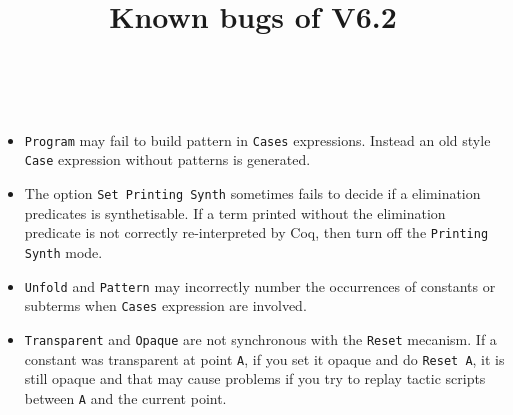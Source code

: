 \documentclass[11pt]{article}
\title{Known bugs of \Coq{} V6.2}
\author{\ }
\begin{document}
\maketitle

\begin{itemize}

\item {\tt Program} may fail to build pattern in {\tt Cases}
expressions. Instead an old style {\tt Case} expression without
patterns is generated.

\item The option {\tt Set Printing Synth} sometimes fails to decide if
a elimination predicates is synthetisable. If a term printed without
the elimination predicate is not correctly re-interpreted by Coq, then
turn off the {\tt Printing Synth} mode.

\item {\tt Unfold} and {\tt Pattern} may incorrectly number the
occurrences of constants or subterms when {\tt Cases} expression are involved.

\item \texttt{Transparent} and \texttt{Opaque} are not synchronous
  with the \texttt{Reset} mecanism. If a constant was transparent at
  point \texttt{A}, if you set it opaque and do \texttt{Reset A}, it
  is still opaque and that may cause problems if you try to replay
  tactic scripts between \texttt{A} and the current point.
 
\end{itemize}
\end{document}
